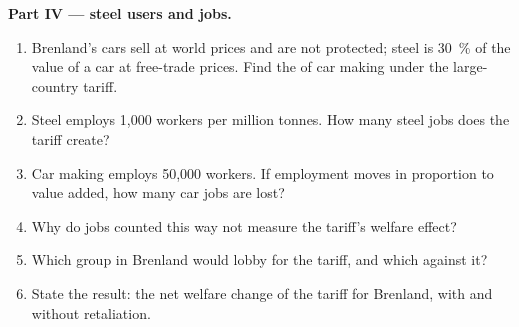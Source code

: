 \begin{problem}
\medskip\noindent\textbf{Part IV --- steel users and jobs.}
\begin{enumerate}[resume]
\item Brenland's cars sell at world prices and are not protected; steel is 30~\% of
the value of a car at free-trade prices. Find the  of
car making under the large-country tariff.
\item Steel employs 1{,}000 workers per million tonnes. How many steel jobs does
the tariff create?
\item Car making employs 50{,}000 workers. If employment moves in proportion to
value added, how many car jobs are lost?
\item Why do jobs counted this way not measure the tariff's welfare effect?
\item Which group in Brenland would lobby for the tariff, and which against it?
\item State the result: the net welfare change of the tariff for Brenland, with and
without retaliation.
\end{enumerate}
\end{problem}
